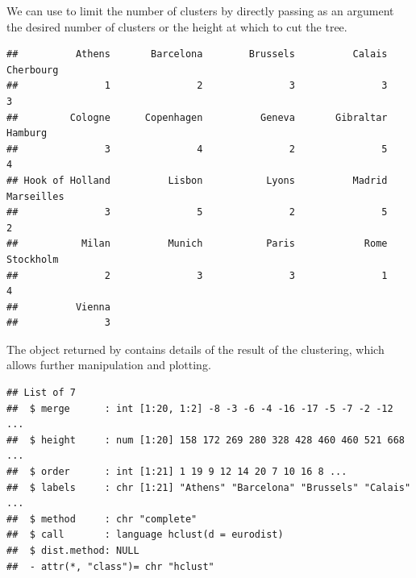 \documentclass[krantz2]{krantz}\usepackage{knitr}
\begin{document}
We can use  to limit the number of clusters by directly passing as an argument the desired number of clusters or the height at which to cut the tree.

\begin{knitrout}\footnotesize
{}\color{fgcolor}\begin{kframe}
\begin{alltt}
  \hlstd{=} \hlstd{)}
\end{alltt}
\begin{verbatim}
##          Athens       Barcelona        Brussels          Calais       Cherbourg 
##               1               2               3               3               3 
##         Cologne      Copenhagen          Geneva       Gibraltar         Hamburg 
##               3               4               2               5               4 
## Hook of Holland          Lisbon           Lyons          Madrid      Marseilles 
##               3               5               2               5               2 
##           Milan          Munich           Paris            Rome       Stockholm 
##               2               3               3               1               4 
##          Vienna 
##               3
\end{verbatim}
\end{kframe}
\end{knitrout}

The object returned by  contains details of the result of the clustering, which allows further manipulation and plotting.
\begin{knitrout}\footnotesize
{}\color{fgcolor}\begin{kframe}
\begin{alltt}
\end{alltt}
\begin{verbatim}
## List of 7
##  $ merge      : int [1:20, 1:2] -8 -3 -6 -4 -16 -17 -5 -7 -2 -12 ...
##  $ height     : num [1:20] 158 172 269 280 328 428 460 460 521 668 ...
##  $ order      : int [1:21] 1 19 9 12 14 20 7 10 16 8 ...
##  $ labels     : chr [1:21] "Athens" "Barcelona" "Brussels" "Calais" ...
##  $ method     : chr "complete"
##  $ call       : language hclust(d = eurodist)
##  $ dist.method: NULL
##  - attr(*, "class")= chr "hclust"
\end{verbatim}
\end{kframe}
\end{knitrout}
\end{document}
